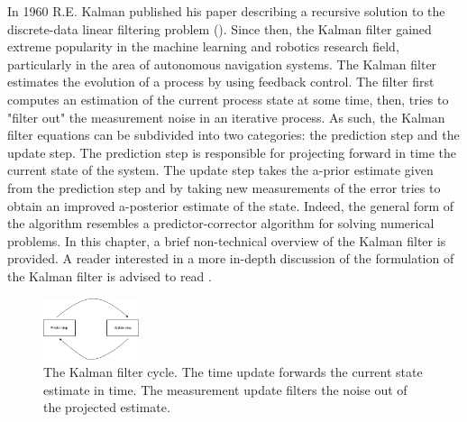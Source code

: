 \documentclass[mscthesis]{usiinfthesis}
\begin{document}
In 1960 R.E. Kalman published his paper describing a recursive solution to the discrete-data linear filtering problem (\citet{paper:kalmanfilter}). Since then, the Kalman filter gained extreme popularity in the machine learning and robotics research field, particularly in the area of autonomous navigation systems. The Kalman filter estimates the evolution of a process by using feedback control. The filter first computes an estimation of the current process state at some time, then, tries to "filter out" the measurement noise in an iterative process. As such, the Kalman filter equations can be subdivided into two categories: the prediction step and the update step. The prediction step is responsible for projecting forward in time the current state of the system. The update step takes the a-prior estimate given from the prediction step and by taking new measurements of the error tries to obtain an improved a-posterior estimate of the state. Indeed, the general form of the algorithm resembles a predictor-corrector algorithm for solving numerical problems. In this chapter, a brief non-technical overview of the Kalman filter is provided. A reader interested in a more in-depth discussion of the formulation of the Kalman filter is advised to read \citet{paper:Maybeck79}.


\begin{figure}[h]
    \centering
    \includegraphics[width=0.25\textwidth]{kalman_diagram.png}
    \caption{The Kalman filter cycle. The time update forwards the current state estimate in time. The measurement update filters the noise out of the projected estimate.}
    \label{fig:kalman_cycle}
\end{figure}

%
%
%
\end{document}
